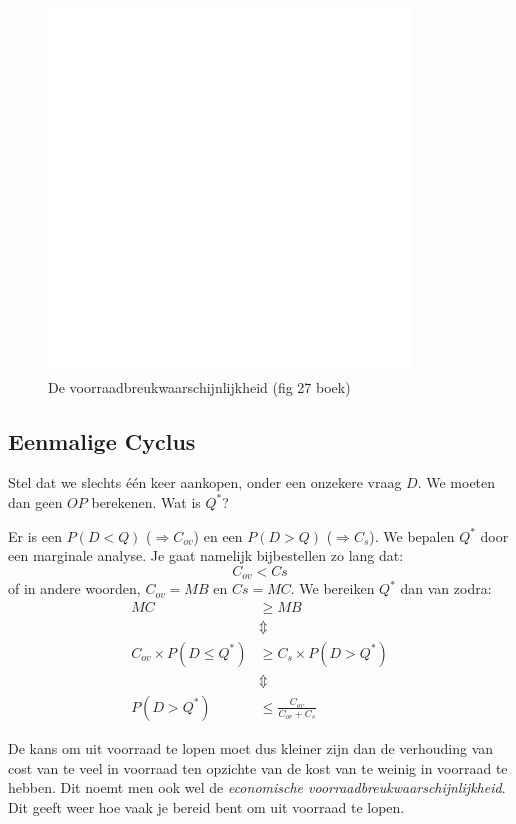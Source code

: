 \begin{figure}[htbp]
    \centering
    \includegraphics[scale=0.4]{Images/white.png}
    \caption{De voorraadbreukwaarschijnlijkheid (fig 27 boek)}
    \label{fig:voorraadbreukwaarschijnlijkheid}
\end{figure}

\subsection{Eenmalige Cyclus}
\label{sub:Eenmalige Cyclus}
Stel dat we slechts \'e\'en keer aankopen, onder een onzekere vraag $D$. We moeten dan geen $OP$ berekenen. Wat is $Q^*$?

Er is een $P(D<Q)$ ($\Rightarrow C_{ov}$) en een $P(D>Q)$ ($\Rightarrow C_s$). We bepalen $Q^*$ door een marginale analyse. Je gaat namelijk bijbestellen zo lang dat:
\begin{equation}
    C_{ov} < C{s}
\end{equation}
of in andere woorden, $C_{ov} = MB$ en $C{s} = MC$. We bereiken $Q^*$ dan van zodra:
\begin{align*}
    MC &\ge MB \\
    &\Updownarrow \\
    C_{ov} \times P(D \le Q^*) &\ge C_s \times P(D > Q^*)\\
    &\Updownarrow \\
    P(D>Q^*) &\le \frac{C_{ov}}{C_{ov} + C_s}
\end{align*}

De kans om uit voorraad te lopen moet dus kleiner zijn dan de verhouding van cost van te veel in voorraad ten opzichte van de kost van te weinig in voorraad te hebben. Dit noemt men ook wel de \textit{economische voorraadbreukwaarschijnlijkheid}. Dit geeft weer hoe vaak je bereid bent om uit voorraad te lopen.


